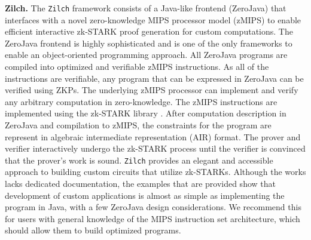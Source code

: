 \textbf{Zilch.}
The \texttt{Zilch} framework \cite{mouris2021zilch} consists of a Java-like frontend (ZeroJava) that interfaces with a novel zero-knowledge MIPS processor model (zMIPS) \cite{TrustworthyComputing2023Zilch} to enable efficient interactive zk-STARK proof generation for custom computations. The ZeroJava frontend is highly sophisticated and is one of the only frameworks to enable an object-oriented programming approach. All ZeroJava programs are compiled into optimized and verifiable zMIPS instructions. As all of the instructions are verifiable, any program that can be expressed in ZeroJava can be verified using ZKPs. The underlying zMIPS processor can implement and verify any arbitrary computation in zero-knowledge. The zMIPS instructions are implemented using the zk-STARK library \cite{ben2018scalable}. After computation description in ZeroJava and compilation to zMIPS, the constraints for the program are represent in algebraic intermediate representation (AIR) format. The prover and verifier interactively undergo the zk-STARK process until the verifier is convinced that the prover's work is sound. 
\texttt{Zilch} provides an elegant and accessible approach to building custom circuits that utilize zk-STARKs. Although the works lacks dedicated documentation, the examples that are provided show that development of custom applications is almost as simple as implementing the program in Java, with a few ZeroJava design considerations. We recommend this for users with general knowledge of the MIPS instruction set architecture, which should allow them to build optimized programs.

